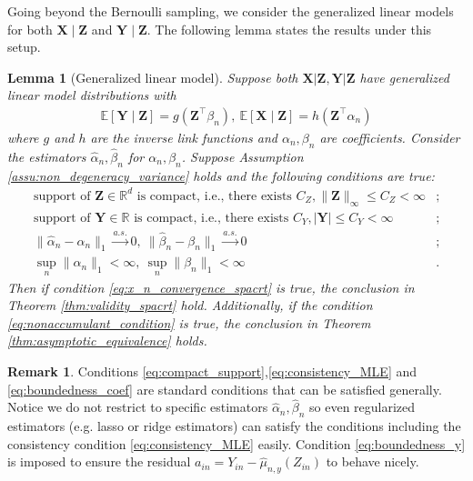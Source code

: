 \documentclass[12pt]{article}
\newtheorem{lemma}{Lemma}
\theoremstyle{definition}
\newtheorem{remark}{Remark}
\newcommand{\E}{\mathbb E}								%
\newcommand{\prx}{\bm X}								%
\newcommand{\prz}{\bm Z}								%
\newcommand{\srz}{Z}									%
\newcommand{\pry}{{\bm Y}}								%
\newcommand{\sry}{Y}									%
\begin{document}
Going beyond the Bernoulli sampling, we consider the generalized linear models for both $\prx\mid\prz$ and $\pry\mid\prz$. The following lemma states the results under this setup.


\begin{lemma}[Generalized linear model]\label{lem:reduction_to_MLE}
  Suppose both $\prx|\prz,\pry|\prz$ have generalized linear model distributions with
  \begin{align*}
    \E[\pry\mid \prz]=g(\prz^\top \beta_{n}),\ \E[\prx \mid \prz]=h(\prz^\top \alpha_{n})
  \end{align*}
  where $g$ and $h$ are the inverse link functions and $\alpha_{n},\beta_{n}$ are coefficients. Consider the estimators $\widehat{\alpha}_n,\widehat{\beta}_{n}$ for $\alpha_{n},\beta_{n}$. Suppose Assumption \ref{assu:non_degeneracy_variance} holds and the following conditions are true:
  \begin{align}
    \text{support of $\prz\in\mathbb{R}^d$ is compact, i.e., there exists }C_Z, \|\prz\|_{\infty}\leq C_Z<\infty &
    \label{eq:compact_support};\\
    \text{support of $\pry\in\mathbb{R}$ is compact, i.e., there exists }C_Y, |\pry|\leq C_Y<\infty &
    \label{eq:boundedness_y};\\
    \|\widehat{\alpha}_n-\alpha_n\|_1\overset{a.s.}{\rightarrow}0,\ \|\widehat{\beta}_n-\beta_n\|_1\overset{a.s.}{\rightarrow}0&
    \label{eq:consistency_MLE};\\
    \sup_{n}\|\alpha_n\|_1<\infty,\ \sup_{n}\|\beta_n\|_1<\infty &
    \label{eq:boundedness_coef}.
  \end{align}
  Then if condition \eqref{eq:x_n_convergence_spacrt} is true, the conclusion in Theorem \ref{thm:validity_spacrt} hold. Additionally, if the condition \eqref{eq:nonaccumulant_condition} is true, the conclusion in Theorem \ref{thm:asymptotic_equivalence} holds. 
\end{lemma}


\begin{remark}
  Conditions \eqref{eq:compact_support},\eqref{eq:consistency_MLE} and \eqref{eq:boundedness_coef} are standard conditions that can be satisfied generally. Notice we do not restrict to specific estimators $\widehat{\alpha}_n,\widehat{\beta}_n$ so even regularized estimators (e.g. lasso or ridge estimators) can satisfy the conditions including the consistency condition \eqref{eq:consistency_MLE} easily. Condition \eqref{eq:boundedness_y} is imposed to ensure the residual $a_{in}=\sry_{in}-\widehat{\mu}_{n,y}(\srz_{in})$ to behave nicely.
\end{remark}
\end{document}
